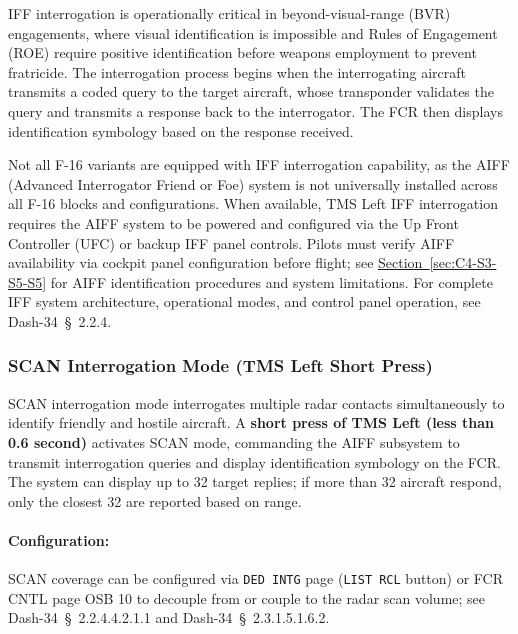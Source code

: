 \documentclass[11pt, a4paper, twoside]{report}
\newcommand{\dashref}[1]{Dash-34~\S~#1}
\newcommand{\secref}[1]{\hyperref[#1]{Section~\ref*{#1}}}
\begin{document}
IFF interrogation is operationally critical in beyond-visual-range (BVR) engagements, where visual identification is impossible and Rules of Engagement (ROE) require positive identification before weapons employment to prevent fratricide. The interrogation process begins when the interrogating aircraft transmits a coded query to the target aircraft, whose transponder validates the query and transmits a response back to the interrogator. The FCR then displays identification symbology based on the response received.

Not all F-16 variants are equipped with IFF interrogation capability, as the AIFF (Advanced Interrogator Friend or Foe) system is not universally installed across all F-16 blocks and configurations. When available, TMS Left IFF interrogation requires the AIFF system to be powered and configured via the Up Front Controller (UFC) or backup IFF panel controls. Pilots must verify AIFF availability via cockpit panel configuration before flight; see \secref{sec:C4-S3-S5-S5} for AIFF identification procedures and system limitations. For complete IFF system architecture, operational modes, and control panel operation, see \dashref{2.2.4}.

\subsubsection{SCAN Interrogation Mode (TMS Left Short Press)}
\label{sec:C4-S3-S5-S1}

SCAN interrogation mode interrogates multiple radar contacts simultaneously to identify friendly and hostile aircraft. A \textbf{short press of TMS Left (less than 0.6 second)} activates SCAN mode, commanding the AIFF subsystem to transmit interrogation queries and display identification symbology on the FCR. The system can display up to 32 target replies; if more than 32 aircraft respond, only the closest 32 are reported based on range.

\paragraph{Configuration:} SCAN coverage can be configured via \texttt{DED INTG} page (\texttt{LIST RCL} button) or FCR CNTL page OSB 10 to decouple from or couple to the radar scan volume; see \dashref{2.2.4.4.2.1.1} and \dashref{2.3.1.5.1.6.2}.
\end{document}

